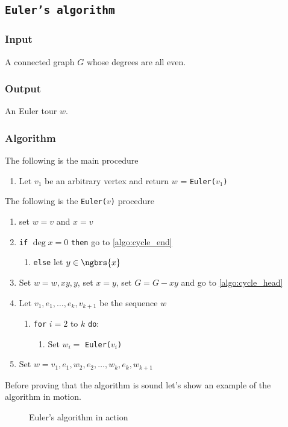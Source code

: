 \subsection{\texttt{Euler's algorithm}}
\subsubsection{Input}
    A connected graph $G$ whose degrees are all even.
\subsubsection{Output}
    An Euler tour $w$.
\subsubsection{Algorithm}
The following is the main procedure
\begin{enumerate}
    \item Let $v_1$ be an arbitrary vertex and return $w$ = \texttt{Euler($v_1$)}
\end{enumerate}
The following is the \texttt{Euler($v$)} procedure
\begin{enumerate}
    \item set $w = v$ and $x = v$
    \item \label{algo:cycle_head} \texttt{if} $\deg{x} = 0$ \texttt{then} go to \ref{algo:cycle_end}
    \begin{enumerate}
        \item \texttt{else} let $y \in \ngbrs{x}$
    \end{enumerate}
    \item Set $w = w, xy, y$, set $x = y$, set $G = G - xy$ and go to \ref{algo:cycle_head}
    \item \label{algo:cycle_end} Let $v_1, e_1, \dots, e_k, v_{k + 1}$ be the sequence $w$
    \begin{enumerate}
        \item \texttt{for} $i = 2$ to $k$ \texttt{do}:
        \begin{enumerate}
            \item Set $w_i =$ \texttt{Euler($v_i$)}
        \end{enumerate}
    \end{enumerate}
    \item Set $w = v_1, e_1, w_2, e_2, \dots, w_k, e_k, w_{k + 1}$
\end{enumerate}
Before proving that the algorithm is sound let's show an example of the algorithm in motion.
\begin{figure}
    \centering
    
    \caption{Euler's algorithm in action}
    \label{fig:eulerian_tour}
\end{figure}
